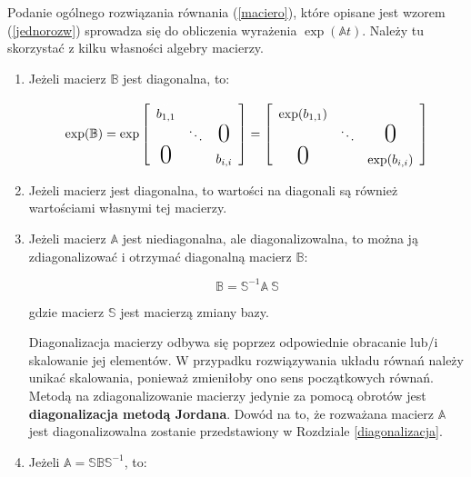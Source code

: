  Podanie ogólnego rozwiązania równania (\ref{maciero}), które opisane jest wzorem (\ref{jednorozw}) sprowadza się do obliczenia wyrażenia $\exp(\mathbb{A}t)$. Należy tu skorzystać z kilku własności algebry macierzy.

\begin{enumerate}[label=\Roman*.]
	\item Jeżeli macierz $\mathbb{B}$ jest diagonalna, to:
	
	\begin{equation}
		\exp(\mathbb{B})=\exp
		\left[\begin{array}{ccc}
			\uu{b_{1,1}}&&\\
			&\ddots&\text{\huge0}\\
			\text{\huge0}&&\uu{b_{i,i}}
		\end{array}\right]=
		\left[\begin{array}{ccc}
			\uu{\exp(b_{1,1})}&&\\
			&\ddots&\text{\huge0}\\
			\text{\huge0}&&\uu{\exp(b_{i,i})}
		\end{array}\right]
		\label{expM}
	\end{equation}
	
	\item Jeżeli macierz jest diagonalna, to wartości na diagonali są również wartościami własnymi tej macierzy.
	
	\item Jeżeli macierz $\mathbb{A}$ jest niediagonalna, ale diagonalizowalna, to można ją zdiagonalizować i otrzymać diagonalną macierz $\mathbb{B}$:
	
	\begin{equation}
		\mathbb{B} = \mathbb{S}^{-1}\mathbb{A} \ \mathbb{S}
		\label{MN}
	\end{equation}
	
	gdzie macierz $\mathbb{S}$ jest macierzą zmiany bazy.
	
	Diagonalizacja macierzy odbywa się poprzez odpowiednie obracanie lub/i skalowanie jej elementów. W przypadku rozwiązywania układu równań należy unikać skalowania, ponieważ zmieniłoby ono sens początkowych równań. Metodą na zdiagonalizowanie macierzy jedynie za pomocą obrotów jest \textbf{diagonalizacja metodą Jordana}. Dowód na to, że rozważana macierz $\mathbb{A}$ jest diagonalizowalna zostanie przedstawiony w Rozdziale \ref{diagonalizacja}.
	
	\item Jeżeli $\mathbb{A} = \mathbb{S}\mathbb{B} \mathbb{S}^{-1}$, to:
	

\end{enumerate}
